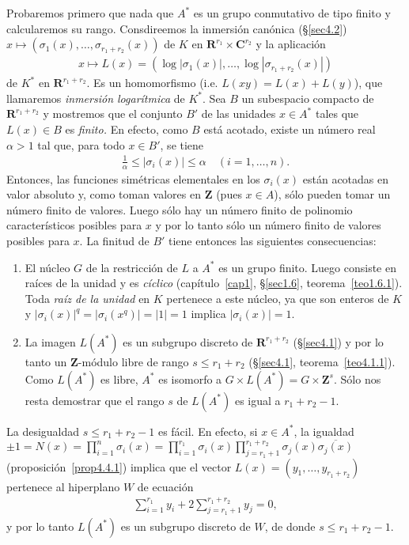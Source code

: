 \documentclass[bibtotoc,leqno,spanish]{amsbook}
\newcommand{\RR}{\mathbf{R}}
\newcommand{\ZZ}{\mathbf{Z}}
\newcommand{\CC}{\mathbf{C}}
\newcommand{\oline}[1]{\overline{#1}}
\newcommand{\abs}[1]{\left\lvert#1\right\rvert}
\numberwithin{equation}{section}
\theoremstyle{note}
\theoremstyle{note}
\theoremstyle{rem}
\numberwithin{theorem}{section}
\numberwithin{proposition}{section}
\numberwithin{definition}{section}
\numberwithin{lemma}{section}
\numberwithin{corollary}{section}
\numberwithin{example}{section}
\numberwithin{footnote}{section}%
\begin{document}
Probaremos primero que nada que $A^{*}$ es un grupo conmutativo de tipo finito y calcularemos su rango.
Consdireemos la inmersi\'on can\'onica (\S\ref{sec4.2}) $x\mapsto(\sigma_{1}(x),\dots,\sigma_{r_{1}+r_{2}}(x))$
de $K$ en $\RR^{r_{1}}\times\CC^{r_{2}}$ y la aplicaci\'on
\begin{gather}
x\mapsto L(x) = (\log\abs{\sigma_{1}(x)},\dots,\log\abs{\sigma_{r_{1}+r_{2}}(x)})
\end{gather}
de $K^{*}$ en $\RR^{r_{1}+r_{2}}$. Es un homomorfismo (i.e. $L(xy) = L(x)+L(y)$), que llamaremos
{\em inmersi\'on logar\'itmica} de $K^{*}$. Sea $B$ un subespacio compacto de $\RR^{r_{1}+r_{2}}$ y
mostremos que el conjunto $B'$ de las unidades $x\in A^{*}$ tales que $L(x)\in B$ es {\em finito.} En
efecto, como $B$ est\'a acotado, existe un n\'umero real $\alpha > 1$ tal que, para todo $x\in B'$, se tiene
\begin{gather*}
\frac{1}{\alpha}\leq\abs{\sigma_{i}(x)}\leq\alpha\quad(i=1,\dots,n).
\end{gather*}
Entonces, las funciones sim\'etricas elementales en los $\sigma_{i}(x)$ est\'an acotadas en valor absoluto
y, como toman valores en $\ZZ$ (pues $x\in A$), s\'olo pueden tomar un n\'umero finito de valores. Luego
s\'olo hay un n\'umero finito de polinomio caracter\'isticos posibles para $x$ y por lo tanto s\'olo un n\'umero
finito de valores posibles para $x$. La finitud de $B'$ tiene entonces las siguientes consecuencias:
\begin{enumerate}
\item El n\'ucleo $G$ de la restricci\'on de $L$ a $A^{*}$ es un grupo finito. Luego consiste en ra\'ices de
la unidad y es {\em c\'iclico} (cap\'itulo~\ref{cap1}, \S\ref{sec1.6}, teorema~\ref{teo1.6.1}). Toda {\em ra\'iz de la unidad} en $K$ pertenece
a este n\'ucleo, ya que son enteros de $K$ y $\abs{\sigma_{i}(x)}^{q}=\abs{\sigma_{i}(x^{q})}=\abs{1}=1$
implica $\abs{\sigma_{i}(x)}=1$.
\item La imagen $L(A^{*})$ es un subgrupo discreto de $\RR^{r_{1}+r_{2}}$ (\S\ref{sec4.1}) y por lo tanto un
$\ZZ$-m\'odulo libre de rango $s\leq r_{1}+r_{2}$ (\S\ref{sec4.1}, teorema~\ref{teo4.1.1}). Como $L(A^{*})$ es libre, $A^{*}$
es isomorfo a $G\times L(A^{*}) = G\times\ZZ^{s}$. S\'olo nos resta demostrar que el rango $s$ de $L(A^{*})$
es igual a $r_{1}+r_{2}-1$.
\end{enumerate}
La desigualdad $s\leq r_{1}+r_{2}-1$ es f\'acil. En efecto, si $x\in A^{*}$, la igualdad
$\pm 1=N(x) = \prod_{i=1}^{n}\sigma_{i}(x) = \prod_{i=1}^{r_{1}}\sigma_{i}(x)\prod_{j=r_{1}+1}^{r_{1}+r_{2}}
\sigma_{j}(x)\oline{\sigma_{j}(x)}$ (proposici\'on~\ref{prop4.4.1})
implica que el vector $L(x) = (y_{1},\dots,y_{r_{1}+r_{2}})$
pertenece al hiperplano $W$ de ecuaci\'on
\begin{gather}\label{eq-4.4-2}
\sum_{i=1}^{r_{1}}y_{i}+2\sum_{j=r_{1}+1}^{r_{1}+r_{2}}y_{j} = 0,
\end{gather}
y por lo tanto $L(A^{*})$ es un subgrupo discreto de $W$, de donde $s\leq r_{1}+r_{2}-1$.
\end{document}
